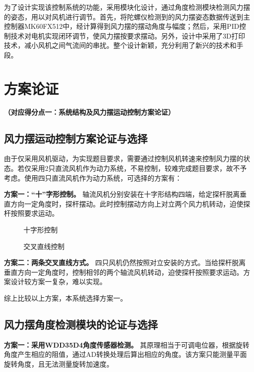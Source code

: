 \documentclass[zihao=-4,fontset=none]{ctexart}
\begin{document}
为了设计实现该控制系统的功能，采用模块化设计，通过角度检测模块检测风力摆的姿态，用以对风机进行调节。首先，将陀螺仪检测到的风力摆姿态数据传送到主控制器MK60FX512中，经计算得到风力摆的摆动角度与幅度；然后，采用PID控制技术对电机实现闭环调节，使风力摆按要求摆动。另外，设计中采用了3D打印技术，减小风机之间气流间的串扰。整个设计新颖，充分利用了新兴的技术和手段。

\section{方案论证}
\textbf{（对应得分点一：系统结构及风力摆运动控制方案论证）}

\subsection{风力摆运动控制方案论证与选择}

由于仅采用风机驱动，为实现题目要求，需要通过控制风机转速来控制风力摆的状态。若仅采用2只直流风机作为动力系统，不易控制，较难完成题目要求，故不予考虑。使用四只直流风机作为动力系统，可选择的方案有：

\textbf{方案一：“十”字形控制。} 轴流风机分别安装在十字形结构四端，给定探杆脱离垂直方向一定角度时，探杆摆动。此时控制摆动方向上对立两个风力机转动，迫使探杆按照要求运动。

\begin{figure}[H]
    \centering
    \caption{十字形控制}
    \label{fig:cross}
\end{figure}

\begin{figure}[H]
    \centering
    \caption{交叉直线控制}
    \label{fig:cross_line}
\end{figure}

\textbf{方案二：两条交叉直线方式。} 四只风机仍然按照对立安装的方式。当给探杆脱离垂直方向一定角度时，控制相邻的两个轴流风机转动，迫使探杆按照要求运动。方案设计较方案一复杂，难以实现。

综上比较以上方案，本系统选择方案一。

\subsection{风力摆角度检测模块的论证与选择}

\textbf{方案一：采用WDD35D4角度传感器检测。} 其原理相当于可调电位器，根据旋转角度产生相应的阻值，通过AD转换处理后算出相应的角度。该方案只能测量平面旋转角度，且无法测量旋转加速度。
\end{document}
